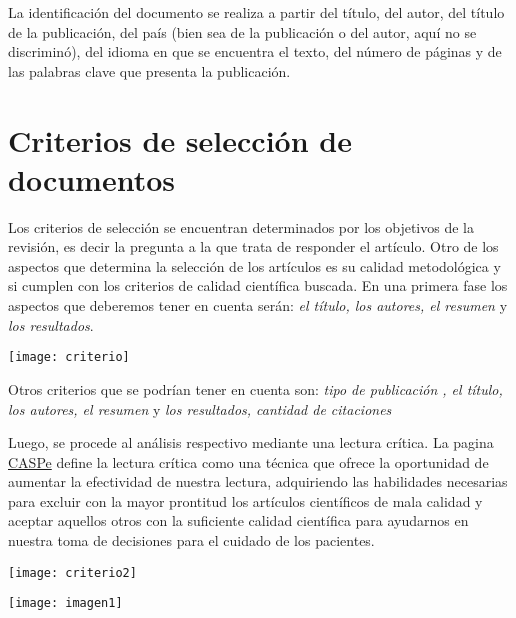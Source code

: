  
 La identificación del documento se realiza a partir del título, del autor, del título de la publicación, del país (bien sea de la publicación o del autor, aquí no se discriminó), del idioma en que se encuentra el texto, del número de páginas y de las palabras clave que presenta la publicación.
 
 

\section{Criterios de selección de documentos}

Los criterios de selección se encuentran determinados por los objetivos de la revisión, es decir la pregunta a la que trata de responder el artículo. Otro de los aspectos que determina la selección de los artículos es su calidad metodológica y si cumplen con los criterios de calidad científica buscada. En una primera fase los aspectos que deberemos tener en cuenta serán:  \textit{el título, los autores, el resumen} y\textit{ los resultados}.


\begin{marginfigure}[-3,2cm]%
	\texttt{[image: criterio]}
\end{marginfigure}

Otros criterios que se podrían tener en cuenta son:  \textit{tipo de publicación , el título, los autores, el resumen} y \textit{los resultados, cantidad de citaciones}

Luego, se procede al análisis respectivo mediante una lectura crítica. La pagina \href{https://www.redcaspe.org/}{CASPe}  define la lectura crítica como una técnica que ofrece la oportunidad de aumentar la efectividad de nuestra lectura, adquiriendo las habilidades necesarias para excluir con la mayor prontitud los artículos científicos de mala calidad y aceptar aquellos otros con la suficiente calidad científica para ayudarnos en nuestra toma de decisiones para el cuidado de los pacientes. 

\begin{marginfigure}[-3.2cm]%
	\texttt{[image: criterio2]}
\end{marginfigure}

\begin{marginfigure}[3.2cm]%
	\texttt{[image: imagen1]}
\end{marginfigure}



